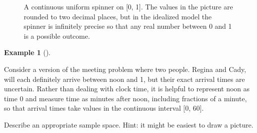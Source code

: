 \documentclass[
  letterpaper,
  DIV=11,
  numbers=noendperiod]{scrreprt}
\theoremstyle{plain}
\theoremstyle{definition}
\newtheorem{example}{Example}[chapter]
\theoremstyle{definition}
\theoremstyle{definition}
\theoremstyle{remark}
\begin{document}
\begin{figure}


\caption{\label{fig-uniform-spinner}A continuous uniform spinner on
{[}0, 1{]}. The values in the picture are rounded to two decimal places,
but in the idealized model the spinner is infinitely precise so that any
real number between 0 and 1 is a possible outcome.}

\end{figure}%

\begin{tcolorbox}[enhanced jigsaw, opacityback=0, left=2mm, colframe=quarto-callout-note-color-frame, toprule=.15mm, breakable, colback=white, leftrule=.75mm, arc=.35mm, rightrule=.15mm, bottomrule=.15mm]

\begin{example}[]\protect\hypertarget{exm-meeting-outcome}{}\label{exm-meeting-outcome}

Consider a version of the meeting problem where two people. Regina and
Cady, will each definitely arrive between noon and 1, but their exact
arrival times are uncertain. Rather than dealing with clock time, it is
helpful to represent noon as time 0 and measure time as minutes after
noon, including fractions of a minute, so that arrival times take values
in the continuous interval {[}0, 60{]}.

Describe an appropriate sample space. Hint: it might be easiest to draw
a picture.

\end{example}

\end{tcolorbox}
\end{document}
